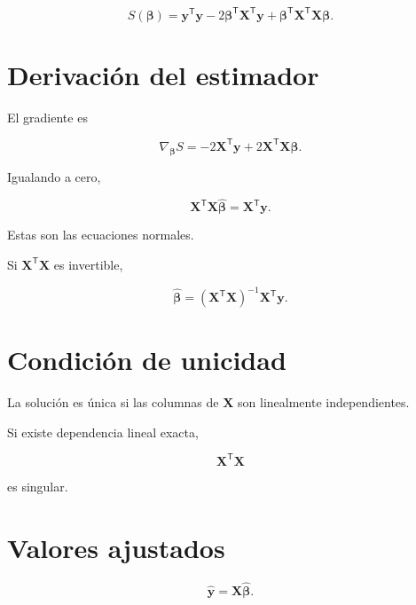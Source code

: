 \documentclass[
  spanish,
  10.5pt,
  letterpaper,
  DIV=11,
  numbers=noendperiod,
  oneside,
  open=any]{scrreprt}
\theoremstyle{definition}
\theoremstyle{definition}
\theoremstyle{plain}
\theoremstyle{remark}
\begin{document}
\[
S(\boldsymbol{\beta})
=
\mathbf{y}^{\mathsf T}\mathbf{y}
-
2\boldsymbol{\beta}^{\mathsf T}\mathbf{X}^{\mathsf T}\mathbf{y}
+
\boldsymbol{\beta}^{\mathsf T}
\mathbf{X}^{\mathsf T}\mathbf{X}
\boldsymbol{\beta}.
\]

\section*{Derivación del estimador}\label{derivaciuxf3n-del-estimador}


El gradiente es

\[
\nabla_{\boldsymbol{\beta}}S
=
-2\mathbf{X}^{\mathsf T}\mathbf{y}
+
2\mathbf{X}^{\mathsf T}\mathbf{X}\boldsymbol{\beta}.
\]

Igualando a cero,

\[
\mathbf{X}^{\mathsf T}\mathbf{X}
\widehat{\boldsymbol{\beta}}
=
\mathbf{X}^{\mathsf T}\mathbf{y}.
\]

Estas son las ecuaciones normales.

Si \(\mathbf{X}^{\mathsf T}\mathbf{X}\) es invertible,

\[
\widehat{\boldsymbol{\beta}}
=
\left(
\mathbf{X}^{\mathsf T}\mathbf{X}
\right)^{-1}
\mathbf{X}^{\mathsf T}\mathbf{y}.
\]

\section*{Condición de unicidad}\label{condiciuxf3n-de-unicidad}


La solución es única si las columnas de \(\mathbf{X}\) son linealmente
independientes.

Si existe dependencia lineal exacta,

\[
\mathbf{X}^{\mathsf T}\mathbf{X}
\]

es singular.

\section*{Valores ajustados}\label{valores-ajustados}


\[
\widehat{\mathbf{y}}
=
\mathbf{X}
\widehat{\boldsymbol{\beta}}.
\]
\end{document}
